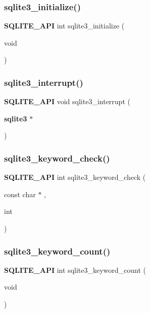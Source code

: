 \mbox{\label{sqlite3_8h_ab0c0ee2d5d4cf8b28e9572296a8861df}} 
\subsubsection{sqlite3\_initialize()}
{\footnotesize\ttfamily \textbf{ S\+Q\+L\+I\+T\+E\+\_\+\+A\+PI} int sqlite3\+\_\+initialize (\begin{DoxyParamCaption}\item[{void}]{ }\end{DoxyParamCaption})}

\mbox{\label{sqlite3_8h_abe6dba4b1d042760f725a3dca4319c41}} 
\subsubsection{sqlite3\_interrupt()}
{\footnotesize\ttfamily \textbf{ S\+Q\+L\+I\+T\+E\+\_\+\+A\+PI} void sqlite3\+\_\+interrupt (\begin{DoxyParamCaption}\item[{\textbf{ sqlite3} $\ast$}]{ }\end{DoxyParamCaption})}

\mbox{\label{sqlite3_8h_a0adfcdc3b4727998d710f12e876b8059}} 
\subsubsection{sqlite3\_keyword\_check()}
{\footnotesize\ttfamily \textbf{ S\+Q\+L\+I\+T\+E\+\_\+\+A\+PI} int sqlite3\+\_\+keyword\+\_\+check (\begin{DoxyParamCaption}\item[{const char $\ast$}]{,  }\item[{int}]{ }\end{DoxyParamCaption})}

\mbox{\label{sqlite3_8h_ac9ce19bc49b5eb08693648896627f2d0}} 
\subsubsection{sqlite3\_keyword\_count()}
{\footnotesize\ttfamily \textbf{ S\+Q\+L\+I\+T\+E\+\_\+\+A\+PI} int sqlite3\+\_\+keyword\+\_\+count (\begin{DoxyParamCaption}\item[{void}]{ }\end{DoxyParamCaption})}

